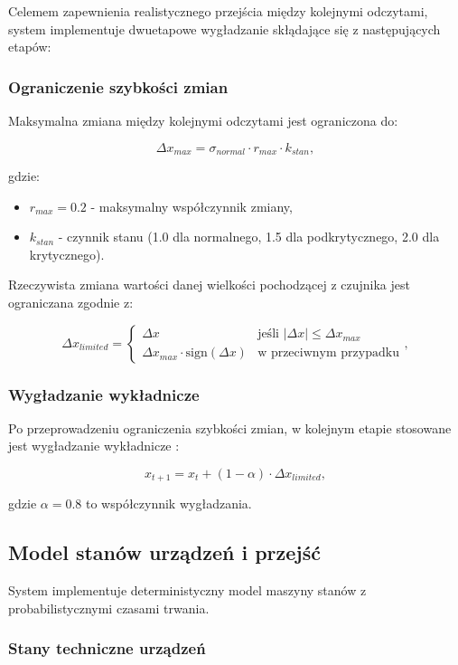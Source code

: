 Celemem zapewnienia realistycznego przejścia między kolejnymi odczytami, system implementuje dwuetapowe wygładzanie skłądające się z następujących etapów:

\subsubsection{Ograniczenie szybkości zmian}

Maksymalna zmiana między kolejnymi odczytami jest ograniczona do:

$$\Delta x_{max} = \sigma_{normal} \cdot r_{max} \cdot k_{stan},$$

gdzie:
\begin{itemize}
    \item $r_{max} = 0.2$ - maksymalny współczynnik zmiany,
    \item $k_{stan}$ - czynnik stanu (1.0 dla normalnego, 1.5 dla podkrytycznego, 2.0 dla krytycznego).
\end{itemize}

Rzeczywista zmiana wartości danej wielkości pochodzącej z czujnika jest ograniczana zgodnie z:

$$\Delta x_{limited} = \begin{cases}
\Delta x & \text{jeśli } |\Delta x| \leq \Delta x_{max} \\
\Delta x_{max} \cdot \text{sign}(\Delta x) & \text{w przeciwnym przypadku}
\end{cases},$$

\subsubsection{Wygładzanie wykładnicze}

Po przeprowadzeniu ograniczenia szybkości zmian, w kolejnym etapie stosowane jest wygładzanie wykładnicze \cite{forecasting_hyndman}:

$$x_{t+1} = x_t + (1-\alpha) \cdot \Delta x_{limited},$$

gdzie $\alpha = 0.8$ to współczynnik wygładzania.

\subsection{Model stanów urządzeń i przejść}
\label{subsec:model_stanow}

System implementuje deterministyczny model maszyny stanów z probabilistycznymi czasami trwania.

\subsubsection{Stany techniczne urządzeń}

